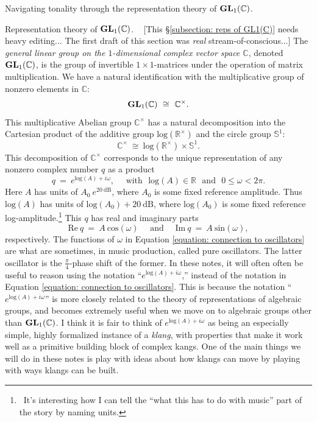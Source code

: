 \documentclass[letterpaper,11pt, reqno]{amsart}
\newtheorem{monodromy theorem}{Monodromy Theorem}[subsection]
\newtheorem{wild conjecture}[theorem]{Wild Conjecture}
\newtheorem{research objectives}{Research objectives}[subsection]
\newtheorem{research question}[theorem]{Research questions}
\newtheorem{aside question}[theorem]{Aside question}
\newtheorem{audio example}[theorem]{\loudspeaker[3] Example}
\newtheorem{blank remark}[theorem]{}
\newtheorem{terminology and comment}[theorem]{Terminology and comment}
\newtheorem{purity hypothesis}[theorem]{Purity hypothesis}
\newtheorem{corollary of the purity hypothesis}[theorem]{Corollary of the purity hypothesis}
\newcommand{\CC} {{\mathbb C}}
\newcommand{\RR} {{\mathbb R}}
\numberwithin{equation}{theorem}
\begin{document}
\begin{section}{Navigating tonality through the representation theory of $\bold{GL}_{1}(\CC)$.}
\begin{subsection}{Representation theory of $\bold{GL}_{1}(\CC)$.}\label{subsection: reps of GL1(C)}
\ {\color{red} [This \S\ref{subsection: reps of GL1(C)} needs heavy editing... The first draft of this section was {\em real} stream-of-conscious...]} The {\em general linear group on the $1$-dimensional complex vector space $\CC$}, denoted $\bold{GL}_{1}(\CC)$, is the group of invertible $1\times 1$-matrices under the operation of matrix multiplication. We have a natural identification with the multiplicative group of nonzero elements in $\CC$:
	$$
	\bold{GL}_{1}(\CC)
	\ \cong\ 
	\CC^\times.
	$$
This multiplicative Abelian group $\CC^\times$ has a natural decomposition into the Cartesian product of the additive group $\text{log}(\RR^\times)$ and the circle group $\mathbb{S}^{1}$:
	$$
	\CC^\times\ \cong\ \text{log}(\RR^\times)\times\mathbb{S}^{1}.
	$$
This decomposition of $\CC^\times$ corresponds to the unique representation of any nonzero complex number $q$ as a product
	$$
	q
	\ =\ 
	e^{\text{log}(A)+i\omega},
	\ \ \ \ \ \ \text{with}\ \ \ 
	\text{log}(A)\in\RR
	\ \ \ \text{and}\ \ \ 
	0\le \omega<2\pi.
	$$
Here $A$ has units of $A_0 \ e^{20\ \text{dB}}$, where $A_{0}$ is some fixed reference amplitude. Thus $\text{log}(A)$ has units of $\text{log}(A_0)+20\ \text{dB}$, where $\text{log}(A_{0})$ is some fixed reference log-amplitude.\footnote{\ It's interesting how I can tell the ``what this has to do with music'' part of the story by naming units.} This $q$ has real and imaginary parts
	\begin{equation}\label{equation: connection to oscillators}
	\text{Re}\ q
	\ =\ 
	A\ \text{cos}(\omega)
	\ \ \ \ \ \ \text{and}\ \ \ \ \ \ 
	\text{Im}\ q
	\ =\ 
	A\ \text{sin}(\omega),
	\end{equation}
respectively. The functions of $\omega$ in Equation \eqref{equation: connection to oscillators} are what are sometimes, in music production, called pure oscillators. The latter oscillator is the $\frac{\pi}{4}$-phase shift of the former. In these notes, it will often often be useful to reason using the notation ``$e^{\text{log}(A)+i\omega}$,'' instead of the notation in Equation \eqref{equation: connection to oscillators}. This is because the notation ``$e^{\text{log}(A)+i\omega}$'' is more closely related to the theory of representations of algebraic groups, and becomes extremely useful when we move on to algebraic groups other than $\bold{GL}_{1}(\CC)$. I think it is fair to think of $e^{\text{log}(A)+i\omega}$ as being an especially simple, highly formalized instance of a {\em klang}, with properties that make it work well as a primitive building block of complex kangs. One of the main things we will do in these notes is play with ideas about how klangs can move by playing with ways klangs can be built.


\end{subsection}
\end{section}
\end{document}

